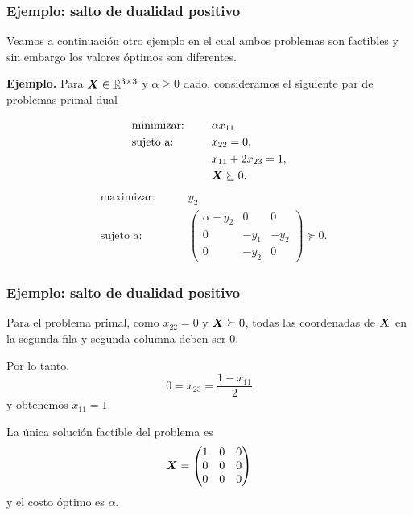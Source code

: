 \documentclass[aspectratio=169,12pt,spanish]{beamer}
\begin{document}
\begin{frame}
\frametitle{Ejemplo: salto de dualidad positivo}

Veamos a continuación otro ejemplo en el cual ambos problemas son factibles y sin embargo los valores óptimos son diferentes.

\textbf{Ejemplo.}
Para $\bm{X} \in \mathbb{R}^{3 \times 3}$ y $\alpha \ge 0$ dado, consideramos el siguiente par de problemas primal-dual

\begin{multicols}{2}\noindent
\begin{alignat*}{2}
  & \text{minimizar: }  & \quad & \alpha x_{11}   \\
   & \text{sujeto a: } & \quad & x_{22} = 0, \\
   &&& x_{11} + 2 x_{23} = 1, \\
   &&& \Xb \succeq 0.
\end{alignat*}
\begin{alignat*}{2}
  & \text{maximizar: }  & \quad & y_2   \\
   & \text{sujeto a: } & \quad & \begin{pmatrix}
\alpha - y_2 & 0 & 0 \\ 0 & -y_1 & -y_2 \\ 0 & -y_2 & 0 \end{pmatrix} \succeq 0.
\end{alignat*}
\end{multicols}


\end{frame}


\begin{frame}
\frametitle{Ejemplo: salto de dualidad positivo}

Para el problema primal, como $x_{22}=0$ y $\bm{X} \succeq 0$, todas las coordenadas de $\bm{X}$ en la segunda fila y segunda columna deben ser 0.

Por lo tanto,
$$0 = x_{23} = \frac{1 - x_{11}}{2}$$ y obtenemos $x_{11} = 1$.

La única solución factible del problema es
$$
\bm{X} = \begin{pmatrix}
1 & 0 & 0 \\ 0 & 0 & 0 \\ 0 & 0 & 0 \end{pmatrix}$$
y el costo óptimo es $\alpha$.

\end{frame}
\end{document}
